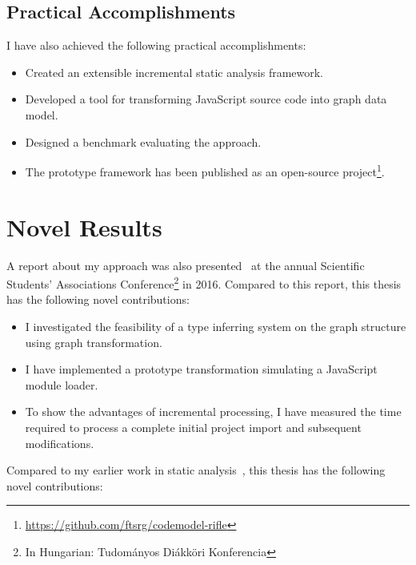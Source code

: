 \subsection{Practical Accomplishments}
I have also achieved the following practical accomplishments:

\begin{itemize}[topsep=0pt]
	\item Created an extensible incremental static analysis framework.
	\item Developed a tool for transforming JavaScript source code into graph data model.
	\item Designed a benchmark evaluating the approach.
	\item The prototype framework has been published as an open-source project\footnote{\small\url{https://github.com/ftsrg/codemodel-rifle}}.
\end{itemize}

\section{Novel Results}
A report about my approach was also presented~\cite{stein-daniel-tdk-2016} at the annual Scientific Students' Associations Conference\footnote{In Hungarian: Tudományos Diákköri Konferencia} in 2016. Compared to this report, this thesis has the following novel contributions:

\begin{itemize}[topsep=0pt]
	\item I investigated the feasibility of a type inferring system on the graph structure using graph transformation.

	\item I have implemented a prototype transformation simulating a JavaScript module loader.

	\item To show the advantages of incremental processing, I have measured the time required to process a complete initial project import and subsequent modifications.
\end{itemize}

Compared to my earlier work in static analysis~\cite{stein-daniel-tdk,stein-daniel-bsc,stein-daniel-ttc}, this thesis has the following novel contributions:

